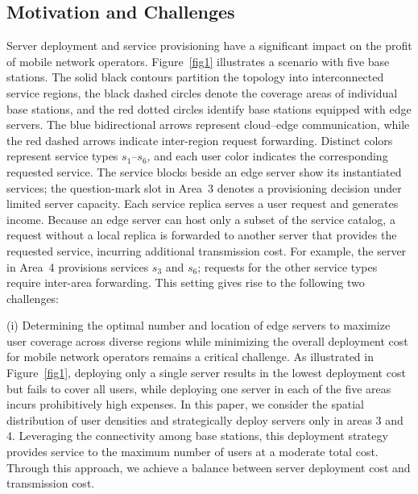 \documentclass[10pt, conference, letterpaper]{IEEEtran}
\begin{document}
\subsection{Motivation and Challenges}

Server deployment and service provisioning have a significant impact on the profit of mobile network operators. Figure~\ref{fig1} illustrates a scenario with five base stations. The solid black contours partition the topology into interconnected service regions, the black dashed circles denote the coverage areas of individual base stations, and the red dotted circles identify base stations equipped with edge servers. The blue bidirectional arrows represent cloud--edge communication, while the red dashed arrows indicate inter-region request forwarding. Distinct colors represent service types $s_1$--$s_6$, and each user color indicates the corresponding requested service. The service blocks beside an edge server show its instantiated services; the question-mark slot in Area~3 denotes a provisioning decision under limited server capacity.
Each service replica serves a user request and generates income. Because an edge server can host only a subset of the service catalog, a request without a local replica is forwarded to another server that provides the requested service, incurring additional transmission cost. For example, the server in Area~4 provisions services $s_3$ and $s_6$; requests for the other service types require inter-area forwarding. This setting gives rise to the following two challenges:


(i) Determining the optimal number and location of edge servers to maximize user coverage across diverse regions while minimizing the overall deployment cost for mobile network operators remains a critical challenge. As illustrated in Figure~\ref{fig1}, deploying only a single server results in the lowest deployment cost but fails to cover all users, while deploying one server in each of the five areas incurs prohibitively high expenses. In this paper, we consider the spatial distribution of user densities and strategically deploy servers only in areas 3 and 4. Leveraging the connectivity among base stations, this deployment strategy provides service to the maximum number of users at a moderate total cost. Through this approach, we achieve a balance between server deployment cost and transmission cost.\par
\end{document}
